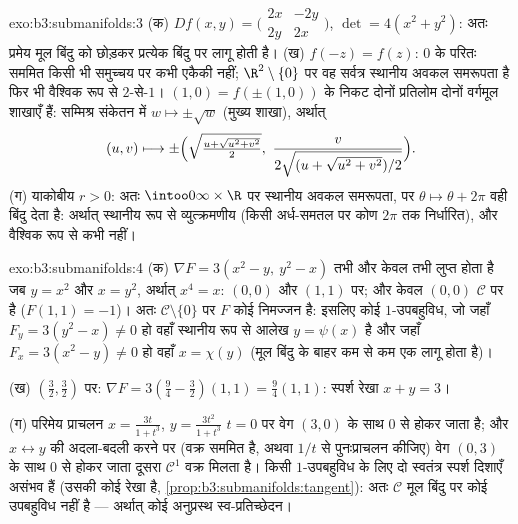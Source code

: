 \begin{solution}{exo:b3:submanifolds:3}
(क) $Df(x,y) = \bigl(\begin{smallmatrix}2x & -2y\\ 2y &
2x\end{smallmatrix}\bigr)$, $\det = 4(x^2 + y^2)$: अतः प्रमेय मूल बिंदु को छोड़कर प्रत्येक बिंदु पर
लागू होती है।
(ख) $f(-z) = f(z)$: $0$ के परितः सममित किसी भी समुच्चय पर कभी एकैकी नहीं;
$\R^2\setminus\{0\}$ पर वह सर्वत्र स्थानीय अवकल समरूपता है फिर भी वैश्विक रूप से
$2$-से-$1$। $(1, 0) = f(\pm(1,
0))$ के निकट दोनों प्रतिलोम दोनों वर्गमूल शाखाएँ हैं:
सम्मिश्र संकेतन में $w \mapsto \pm\sqrt w$ (मुख्य शाखा), अर्थात्
\[
(u, v) \longmapsto \pm\Bigl(\sqrt{\tfrac{u +
\sqrt{u^2+v^2}}{2}},\ \frac{v}{2\sqrt{(u +
\sqrt{u^2+v^2})/2}}\Bigr).
\]
(ग) याकोबीय $r > 0$: अतः $\intoo0\infty\times\R$ पर स्थानीय अवकल समरूपता, पर $\theta \mapsto \theta + 2\pi$ वही बिंदु
देता है: अर्थात् स्थानीय रूप से व्युत्क्रमणीय (किसी अर्ध-समतल पर
कोण $2\pi$ तक निर्धारित), और वैश्विक रूप से कभी नहीं।
\end{solution}

\begin{solution}{exo:b3:submanifolds:4}
(क) $\nabla F = 3(x^2 - y,\ y^2 - x)$ तभी और केवल तभी लुप्त होता है जब $y = x^2$ और $x = y^2$, अर्थात्
$x^4 = x$: $(0,0)$ और $(1,1)$ पर; और केवल $(0,0)$ $\mathcal C$ पर है ($F(1,1) = -1$)। अतः $\mathcal
C\setminus\{0\}$ पर
$F$ कोई निमज्जन है: इसलिए कोई $1$-उपबहुविध, जो जहाँ $F_y = 3(y^2 - x) \neq 0$ हो वहाँ
स्थानीय रूप से आलेख $y = \psi(x)$ है और जहाँ $F_x = 3(x^2 - y) \neq 0$ हो वहाँ $x = \chi(y)$ (मूल बिंदु के
बाहर कम से कम एक लागू होता है)।

(ख) $(\frac32, \frac32)$ पर: $\nabla F = 3(\frac94 - \frac32)
(1, 1) = \frac94(1,1)$: स्पर्श रेखा $x + y = 3$।

(ग) परिमेय प्राचलन $x = \frac{3t}{1 + t^3}$, $y = \frac{3t^2}{1+t^3}$ $t = 0$ पर वेग $(3, 0)$ के साथ $0$ से होकर
जाता है; और $x \leftrightarrow y$ की अदला-बदली करने पर (वक्र सममित है, अथवा $1/t$ से
पुनःप्राचलन कीजिए) वेग $(0, 3)$ के साथ $0$ से होकर जाता दूसरा $\mathcal C^1$ वक्र
मिलता है। किसी $1$-उपबहुविध के लिए दो स्वतंत्र स्पर्श दिशाएँ असंभव
हैं (उसकी  कोई रेखा है, \cref{prop:b3:submanifolds:tangent}): अतः $\mathcal C$ मूल बिंदु पर
कोई उपबहुविध नहीं है --- अर्थात् कोई अनुप्रस्थ स्व-प्रतिच्छेदन।
\end{solution}


